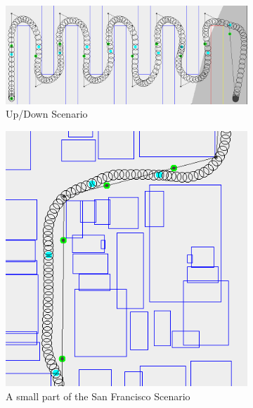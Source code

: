\begin{figure}
	\centering
	
	\begin{subfigure}[t]{0.7\columnwidth}
        		\includegraphics[width=\textwidth]{img/benchmarkfull}
        		\caption{Up/Down Scenario}
        		\label{fig:scen-updown}
	\end{subfigure}
	\par\bigskip
	\begin{subfigure}[t]{0.38\columnwidth}
        		\includegraphics[width=\textwidth]{img/SF_zoom}
        		\caption{A small part of the San Francisco Scenario}
        		 \label{fig:scen-sf}
	\end{subfigure}	
		\hfil
	\begin{subfigure}[t]{0.38\columnwidth}

\end{subfigure}
\end{figure}
